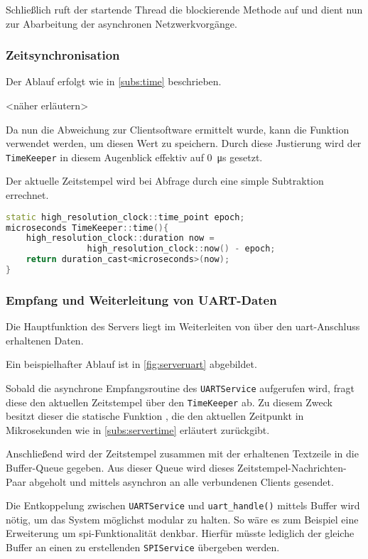 Schließlich ruft der startende Thread die blockierende Methode
 auf und dient nun zur Abarbeitung der
asynchronen Netzwerkvorgänge.
\subsubsection*{Zeitsynchronisation}
Der Ablauf erfolgt wie in \autoref{subs:time} beschrieben.

<näher erläutern>

Da nun die Abweichung zur Clientsoftware ermittelt wurde, kann die Funktion
\newline{} verwendet werden,
um diesen Wert zu speichern. Durch diese Justierung wird der \texttt{TimeKeeper}
in diesem Augenblick effektiv auf \SI{0}{\micro\second} gesetzt.

Der aktuelle Zeitstempel wird bei Abfrage durch eine simple Subtraktion
errechnet.
\begin{lstlisting}[language=C++]
static high_resolution_clock::time_point epoch;
microseconds TimeKeeper::time(){
    high_resolution_clock::duration now = 
    			high_resolution_clock::now() - epoch;
    return duration_cast<microseconds>(now);
}
\end{lstlisting}

\subsubsection*{Empfang und Weiterleitung von UART-Daten}
Die Hauptfunktion des Servers liegt im Weiterleiten von über den
\gls{uart}-Anschluss erhaltenen Daten.

Ein beispielhafter Ablauf ist in \autoref{fig:serveruart} abgebildet.

Sobald die asynchrone Empfangsroutine des \texttt{UARTService} aufgerufen wird,
fragt diese den aktuellen Zeitstempel über den \texttt{TimeKeeper} ab. Zu
diesem Zweck besitzt dieser die statische Funktion , die den
aktuellen Zeitpunkt in Mikrosekunden wie in \autoref{subs:servertime}
erläutert zurückgibt.

Anschließend wird der Zeitstempel zusammen mit der erhaltenen Textzeile in die
Buffer-Queue gegeben. Aus dieser Queue wird dieses Zeitstempel-Nachrichten-Paar
abgeholt und mittels  asynchron an alle verbundenen Clients gesendet.

Die Entkoppelung zwischen \texttt{UARTService} und \texttt{uart\_handle()}
mittels Buffer wird nötig, um das System möglichst modular zu halten. So wäre es
zum Beispiel eine Erweiterung um \gls{spi}-Funktionalität denkbar. Hierfür müsste
lediglich der gleiche Buffer an einen zu erstellenden \texttt{SPIService}
übergeben werden.

